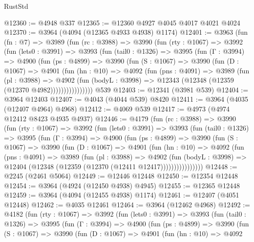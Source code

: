 \begin{lexlean}{RustStd}
\begin{coremodule}
{\begin{coremodule}
{{{{{{{{{{{{{{{{{{{{{{{{{{{{{{{{{{{{{{@12360 := @4948 @337
@12365 := @12360 @4927 @4045 @4017 @4021 @4024
@12370 := @3964 (@4094 (@12365 @4933 @4938) @1174)
@12401 := @3963
    (fun (fn : @7) =>
    @3989
      (fun (rc : @3988) =>
      @3990
        (fun (rty : @1067) =>
        @3992
          (fun (lets0 : @3991) =>
          @3993
            (fun (tail0 : @1326) =>
            @3995
              (fun (Γ : @3994) =>
              @4900
                (fun (ps : @4899) =>
                @3990
                  (fun (S : @1067) =>
                  @3990
                    (fun (D : @1067) =>
                    @4901
                      (fun (hn : @10) =>
                      @4092
                        (fun (pns : @4091) =>
                        @3989
                          (fun (pl : @3988) =>
                          @4902
                            (fun (bodyL : @3998) =>
                            @12343 (@12348 (@12359 (@12370 @4982))))))))))))))))
    @539
@12403 := @12341 (@3981 @539)
@12404 := @3964 @12403
@12407 := @4043 (@4044 @539) @8420
@12411 := @3964 (@4035 (@12407 @4964) @4968)
@12412 := @4069 @539
@12417 := @4973 (@4974 @12412 @8423 @4935 @4937)
@12446 := @4179
    (fun (rc : @3988) =>
    @3990
      (fun (rty : @1067) =>
      @3992
        (fun (lets0 : @3991) =>
        @3993
          (fun (tail0 : @1326) =>
          @3995
            (fun (Γ : @3994) =>
            @4900
              (fun (ps : @4899) =>
              @3990
                (fun (S : @1067) =>
                @3990
                  (fun (D : @1067) =>
                  @4901
                    (fun (hn : @10) =>
                    @4092
                      (fun (pns : @4091) =>
                      @3989
                        (fun (pl : @3988) =>
                        @4902
                          (fun (bodyL : @3998) =>
                          @12404 (@12348 (@12359 (@12370 (@12411 @12417))))))))))))))))
@12448 := @2245 (@2461 @5064)
@12449 := @12446 @12448
@12450 := @12354 @12448
@12454 := @3964 (@4924 (@12450 @4938) @4945)
@12455 := @12365 @12448
@12459 := @3964 (@4094 (@12455 @4938) @1174)
@12461 := @12407 (@4051 @12448)
@12462 := @4035 @12461
@12464 := @3964 (@12462 @4968)
@12492 := @4182
    (fun (rty : @1067) =>
    @3992
      (fun (lets0 : @3991) =>
      @3993
        (fun (tail0 : @1326) =>
        @3995
          (fun (Γ : @3994) =>
          @4900
            (fun (ps : @4899) =>
            @3990
              (fun (S : @1067) =>
              @3990
                (fun (D : @1067) =>
                @4901
                  (fun (hn : @10) =>
                  @4092
}}}}}}}}}}}}}}}}}}}}}}}}}}}}}}}}}}}}}}
\end{coremodule}}
\end{coremodule}
\end{lexlean}
